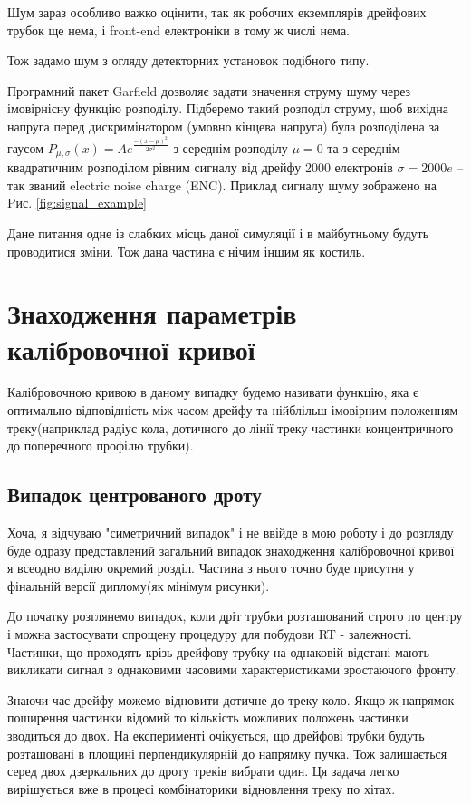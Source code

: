 \documentclass[]{article}
\begin{document}
	Шум зараз особливо важко оцінити, так як робочих екземплярів дрейфових трубок ще нема, і front-end електроніки в тому ж числі нема.
	
	Тож задамо шум з огляду детекторних установок подібного типу.
	
	Програмний пакет Garfield дозволяє задати значення струму шуму через імовірнісну функцію розподілу. Підберемо такий розподіл струму, щоб вихідна напруга перед дискримінатором (умовно кінцева напруга) була розподілена за гаусом 
	$P_{\mu,\sigma}(x) = Ae^{\frac{-(x-\mu)^2}{2\sigma^2}}$ 
	з середнім розподілу $\mu=0$ та з середнім квадратичним розподілом рівним сигналу від дрейфу 2000 електронів $ \sigma = 2000e$ -- так званий electric noise charge (ENC). Приклад сигналу шуму зображено на Pис. \ref{fig:signal_example}
	
	Дане питання одне із слабких місць даної симуляції і в майбутньому будуть проводитися зміни. Тож дана частина є нічим іншим як костиль.

	
	\section{Знаходження параметрів калібровочної кривої}
	
	Калібровочною кривою в даному випадку будемо називати функцію, яка є оптимально відповідність між часом дрейфу та нійблільш імовірним положенням треку(наприклад радіус кола, дотичного до лінії треку частинки концентричного до поперечного профілю трубки).\\
		
	\subsection{Випадок центрованого дроту}
	Хоча, я відчуваю "симетричний випадок" і не ввійде в мою роботу і до розгляду буде одразу представлений загальний випадок знаходження калібровочної кривої я всеодно виділю окремий розділ. Частина з нього точно буде присутня у фінальній версії диплому(як мінімум рисунки).
	
	До початку розглянемо випадок, коли дріт трубки розташований строго по центру і можна застосувати спрощену процедуру для побудови RT - залежності. Частинки, що проходять крізь дрейфову трубку на однаковій відстані мають викликати сигнал з однаковими часовими характеристиками зростаючого фронту. 
	
	Знаючи час дрейфу можемо відновити дотичне до треку коло. Якщо ж напрямок поширення частинки відомий то кількість можливих положень частинки зводиться до двох. На експерименті очікується, що дрейфові трубки будуть розташовані в площині перпендикулярній до напрямку пучка. Тож залишається серед двох дзеркальних до дроту треків вибрати один. Ця задача легко вирішується вже в процесі комбінаторики відновлення треку по хітах.
	
\end{document}
